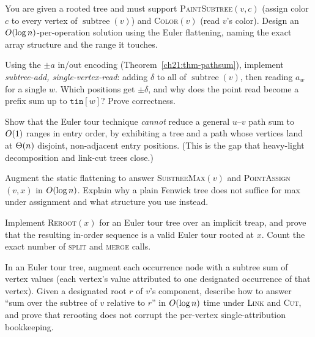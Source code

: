 \begin{exercise}
You are given a rooted tree and must support \textsc{PaintSubtree}$(v,c)$ (assign color
$c$ to every vertex of $\operatorname{subtree}(v)$) and \textsc{Color}$(v)$ (read $v$'s color). Design
an $O(\log n)$-per-operation solution using the Euler flattening, naming the exact
array structure and the range it touches.
\end{exercise}

\begin{exercise}
\label{ch21:ex-subtreeadd}
Using the $\pm a$ in/out encoding (Theorem~\ref{ch21:thm-pathsum}), implement
\emph{subtree-add, single-vertex-read}: adding $\delta$ to all of $\operatorname{subtree}(v)$, then
reading $a_w$ for a single $w$. Which positions get $\pm\delta$, and why does the point
read become a prefix sum up to $\texttt{tin}[w]$? Prove correctness.
\end{exercise}

\begin{exercise}
Show that the Euler tour technique \emph{cannot} reduce a general $u$--$v$ path sum to
$O(1)$ ranges in entry order, by exhibiting a tree and a path whose vertices land at
$\Theta(n)$ disjoint, non-adjacent entry positions. (This is the gap that heavy-light
decomposition and link-cut trees close.)
\end{exercise}

\begin{exercise}
Augment the static flattening to answer \textsc{SubtreeMax}$(v)$ and
\textsc{PointAssign}$(v,x)$ in $O(\log n)$. Explain why a plain Fenwick tree does not
suffice for max under assignment and what structure you use instead.
\end{exercise}

\begin{exercise}
Implement \textsc{Reroot}$(x)$ for an Euler tour tree over an implicit treap, and prove
that the resulting in-order sequence is a valid Euler tour rooted at $x$. Count the
exact number of \textsc{split} and \textsc{merge} calls.
\end{exercise}

\begin{exercise}
In an Euler tour tree, augment each occurrence node with a subtree sum of vertex
values (each vertex's value attributed to one designated occurrence of that vertex). Given a designated root $r$ of $v$'s component, describe how
to answer ``sum over the subtree of $v$ relative to $r$'' in $O(\log n)$ time under \textsc{Link} and
\textsc{Cut}, and prove that rerooting does not corrupt the per-vertex single-attribution
bookkeeping.
\end{exercise}

